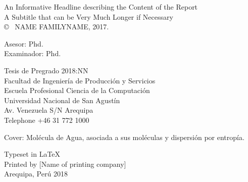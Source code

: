 \newpage
\thispagestyle{plain}
\vspace*{4.5cm}
An Informative Headline describing the Content of the Report\\
A Subtitle that can be Very Much Longer if Necessary\\

\copyright ~ NAME FAMILYNAME, 2017. \setlength{\parskip}{1cm}

Asesor: Phd. \\
Examinador: Phd.  \setlength{\parskip}{1cm}

Tesis de Pregrado 2018:NN\\	%
Facultad de Ingeniería de Producción y Servicios\\
Escuela Profesional Ciencia de la Computaci\'on\\
Universidad Nacional de San Agustín\\
Av. Venezuela S/N Arequipa\\
Telephone +46 31 772 1000 \setlength{\parskip}{0.5cm}

\vfill
Cover: Molécula de Agua, asociada a sus moléculas y dispersión por entropía. \setlength{\parskip}{0.5cm}

Typeset in \LaTeX \\
Printed by [Name of printing company]\\
Arequipa, Perú 2018

